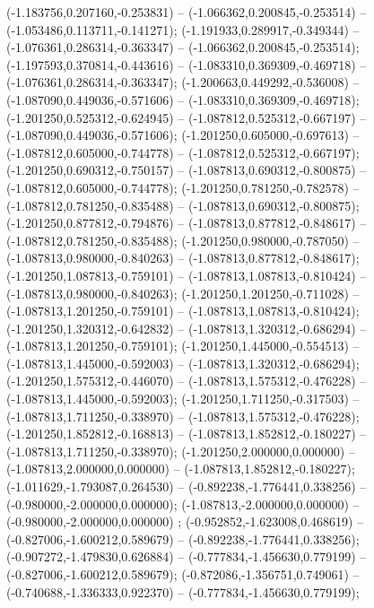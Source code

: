  (-1.183756,0.207160,-0.253831) -- (-1.066362,0.200845,-0.253514) -- (-1.053486,0.113711,-0.141271);
 (-1.191933,0.289917,-0.349344) -- (-1.076361,0.286314,-0.363347) -- (-1.066362,0.200845,-0.253514);
 (-1.197593,0.370814,-0.443616) -- (-1.083310,0.369309,-0.469718) -- (-1.076361,0.286314,-0.363347);
 (-1.200663,0.449292,-0.536008) -- (-1.087090,0.449036,-0.571606) -- (-1.083310,0.369309,-0.469718);
 (-1.201250,0.525312,-0.624945) -- (-1.087812,0.525312,-0.667197) -- (-1.087090,0.449036,-0.571606);
 (-1.201250,0.605000,-0.697613) -- (-1.087812,0.605000,-0.744778) -- (-1.087812,0.525312,-0.667197);
 (-1.201250,0.690312,-0.750157) -- (-1.087813,0.690312,-0.800875) -- (-1.087812,0.605000,-0.744778);
 (-1.201250,0.781250,-0.782578) -- (-1.087812,0.781250,-0.835488) -- (-1.087813,0.690312,-0.800875);
 (-1.201250,0.877812,-0.794876) -- (-1.087813,0.877812,-0.848617) -- (-1.087812,0.781250,-0.835488);
 (-1.201250,0.980000,-0.787050) -- (-1.087813,0.980000,-0.840263) -- (-1.087813,0.877812,-0.848617);
 (-1.201250,1.087813,-0.759101) -- (-1.087813,1.087813,-0.810424) -- (-1.087813,0.980000,-0.840263);
 (-1.201250,1.201250,-0.711028) -- (-1.087813,1.201250,-0.759101) -- (-1.087813,1.087813,-0.810424);
 (-1.201250,1.320312,-0.642832) -- (-1.087813,1.320312,-0.686294) -- (-1.087813,1.201250,-0.759101);
 (-1.201250,1.445000,-0.554513) -- (-1.087813,1.445000,-0.592003) -- (-1.087813,1.320312,-0.686294);
 (-1.201250,1.575312,-0.446070) -- (-1.087813,1.575312,-0.476228) -- (-1.087813,1.445000,-0.592003);
 (-1.201250,1.711250,-0.317503) -- (-1.087813,1.711250,-0.338970) -- (-1.087813,1.575312,-0.476228);
 (-1.201250,1.852812,-0.168813) -- (-1.087813,1.852812,-0.180227) -- (-1.087813,1.711250,-0.338970);
 (-1.201250,2.000000,0.000000) -- (-1.087813,2.000000,0.000000) -- (-1.087813,1.852812,-0.180227);
 (-1.011629,-1.793087,0.264530) -- (-0.892238,-1.776441,0.338256) -- (-0.980000,-2.000000,0.000000);
 (-1.087813,-2.000000,0.000000) -- (-0.980000,-2.000000,0.000000) ;
 (-0.952852,-1.623008,0.468619) -- (-0.827006,-1.600212,0.589679) -- (-0.892238,-1.776441,0.338256);
 (-0.907272,-1.479830,0.626884) -- (-0.777834,-1.456630,0.779199) -- (-0.827006,-1.600212,0.589679);
 (-0.872086,-1.356751,0.749061) -- (-0.740688,-1.336333,0.922370) -- (-0.777834,-1.456630,0.779199);
